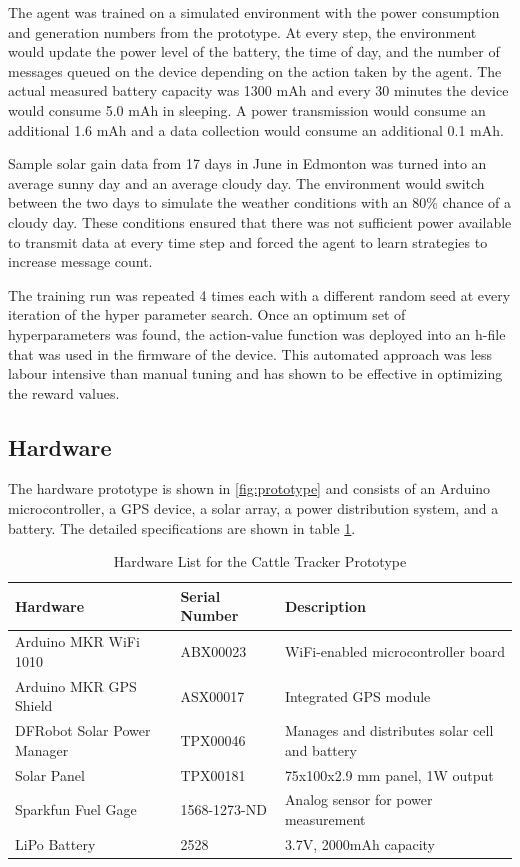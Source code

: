 \documentclass[10pt]{cai}
\begin{document}
The agent was trained on a simulated environment with the power consumption and generation numbers from the prototype.
At every step, the environment would update the power level of the battery, the time of day, and the number of messages queued on the device depending on the action taken by the agent.
The actual measured battery capacity was 1300 mAh and every 30 minutes the device would consume 5.0 mAh in sleeping.
A power transmission would consume an additional 1.6 mAh and a data collection would consume an additional 0.1 mAh.

Sample solar gain data from 17 days in June in Edmonton was turned into an average sunny day and an average cloudy day. 
The environment would switch between the two days to simulate the weather conditions with an 80\% chance of a cloudy day.
These conditions ensured that there was not sufficient power available to transmit data at every time step and forced the agent to learn strategies to increase message count.

The training run was repeated 4 times each with a different random seed at every iteration of the hyper parameter search.
Once an optimum set of hyperparameters was found, the action-value function was deployed into an h-file that was used in the firmware of the device.
This automated approach was less labour intensive than manual tuning and has shown to be effective in optimizing the reward values.

\subsection{Hardware}
The hardware prototype is shown in \ref{fig:prototype} and consists of an Arduino microcontroller, a GPS device,  a solar array, a power distribution system, and a battery.
The detailed specifications are shown in table \ref{tab:hardware_inventory}.

\begin{table}[h!]
  \centering
  \caption{Hardware List for the Cattle Tracker Prototype}
  \begin{tabular}{|l|l|l|}
  \hline
  \textbf{Hardware} & \textbf{Serial Number} &  \textbf{Description} \\ \hline
  Arduino MKR WiFi 1010 & ABX00023 &  WiFi-enabled microcontroller board \\ \hline
  Arduino MKR GPS Shield & ASX00017 &  Integrated GPS module \\ \hline
  DFRobot Solar Power Manager & TPX00046 &  Manages and distributes solar cell and battery \\ \hline
  Solar Panel & TPX00181 &  75x100x2.9 mm panel, 1W output \\ \hline
  Sparkfun Fuel Gage & 1568-1273-ND & Analog sensor for power measurement \\ \hline
  LiPo Battery & 2528 &  3.7V, 2000mAh capacity \\ \hline
  \end{tabular}
  \label{tab:hardware_inventory}
  \end{table}
\end{document}
